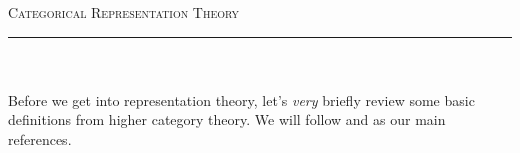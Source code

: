 



\thispagestyle{fancy}

\begin{center}
\LARGE\scshape Categorical Representation Theory\noindent\\[-\linespacing]
\rule{0.75\linewidth}{1pt}
\end{center}
\noindent\\[-0.75\linespacing]

\noindent\\ Before we get into representation theory, let's {\em very} briefly review some basic definitions from higher category theory. We will follow \cite{Mal18} and \cite[\S 9]{Str95} as our main references.\\

